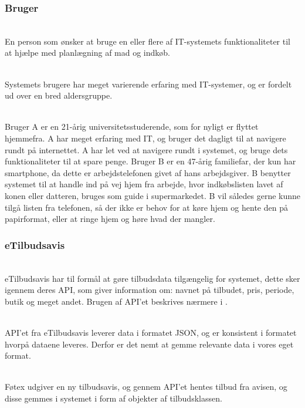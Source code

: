 \subsubsection{Bruger}

\begin{description}[font=\normalfont\itshape]
\item[Formål]\hfill\\
En person som ønsker at bruge en eller flere af IT-systemets funktionaliteter til at hjælpe med planlægning af mad og indkøb.
\item[Karakteristik]\hfill\\
Systemets brugere har meget varierende erfaring med IT-systemer, og er fordelt ud over en bred aldersgruppe.
\item[Eksempler]\hfill\\
Bruger A er en 21-årig universitetsstuderende, som for nyligt er flyttet hjemmefra. A har meget erfaring med IT, og bruger det dagligt til at navigere rundt på internettet.
A har let ved at navigere rundt i systemet, og bruge dets funktionaliteter til at spare penge.
Bruger B er en 47-årig familiefar, der kun har smartphone, da dette er arbejdstelefonen givet af hans arbejdsgiver.
B benytter systemet til at handle ind på vej hjem fra arbejde, hvor indkøbslisten lavet af konen eller datteren, bruges som guide i supermarkedet.
B vil således gerne kunne tilgå listen fra telefonen, så der ikke er behov for at køre hjem og hente den på papirformat, eller at ringe hjem og høre hvad der mangler.
\end{description}

\subsubsection{eTilbudsavis}

\begin{description}[font=\normalfont\itshape]
\item[Formål]\hfill\\ 
eTilbudsavis har til formål at gøre tilbudsdata tilgængelig for systemet, dette sker igennem deres API, som giver information om: navnet på tilbudet, pris, periode, butik og meget andet. 
Brugen af API'et beskrives nærmere i .
\item[Karakteristik]\hfill\\
API'et fra eTilbudsavis leverer data i formatet JSON, og er konsistent i formatet hvorpå dataene leveres. 
Derfor er det nemt at gemme relevante data i vores eget format.
\item[Eksempel]\hfill\\
Føtex udgiver en ny tilbudsavis, og gennem API'et hentes tilbud fra avisen, og disse gemmes i systemet i form af objekter af tilbudsklassen.
\end{description}

